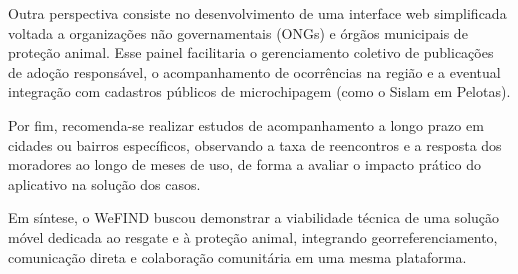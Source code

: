 Outra perspectiva consiste no desenvolvimento de uma interface web simplificada voltada a organizações não governamentais (ONGs) e órgãos municipais de proteção animal. Esse painel facilitaria o gerenciamento coletivo de publicações de adoção responsável, o acompanhamento de ocorrências na região e a eventual integração com cadastros públicos de microchipagem (como o Sislam em Pelotas).

Por fim, recomenda-se realizar estudos de acompanhamento a longo prazo em cidades ou bairros específicos, observando a taxa de reencontros e a resposta dos moradores ao longo de meses de uso, de forma a avaliar o impacto prático do aplicativo na solução dos casos.

Em síntese, o WeFIND buscou demonstrar a viabilidade técnica de uma solução móvel dedicada ao resgate e à proteção animal, integrando georreferenciamento, comunicação direta e colaboração comunitária em uma mesma plataforma.
